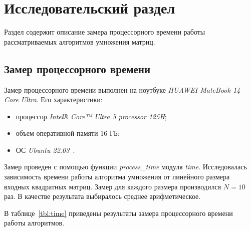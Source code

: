 \chapter{Исследовательский раздел}

Раздел содержит описание замера процессорного времени работы рассматриваемых алгоритмов умножения матриц.

\section{Замер процессорного времени}
Замер процессорного времени выполнен на ноутбуке \textit{HUAWEI MateBook 14 Core Ultra}. Его характеристики:
\begin{itemize}[label=--]
    \item процессор \textit{Intel® Core™ Ultra 5 processor 125H};
    \item объем оперативной памяти 16 ГБ;
    \item ОС \textit{Ubuntu 22.03}~\cite{laptop}.
\end{itemize}

Замер проведен с помощью функции \textit{process\_time} модуля \textit{time}. Исследовалась зависимость времени работы алгоритма умножения от линейного размера входных квадратных матриц. Замер для каждого размера производился $N = 10$ раз. В качестве результата выбиралось среднее арифметическое.

В таблице~\ref{tbl:time} приведены результаты замера процессорного времени работы алгоритмов.

